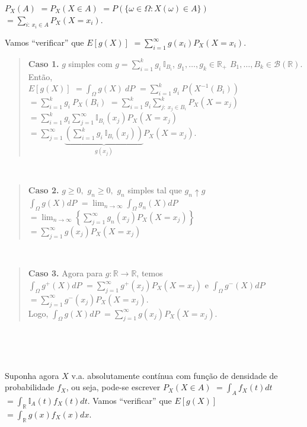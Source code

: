 \documentclass[
]{book}
\begin{document}
\(P_X(A)\) \(=P_X(X \in A)\) \(=P\left(\{\omega\in\Omega: X(\omega) \in A\}\right)\) \(=\displaystyle\sum_{i:~x_i\in A} P_X(X=x_i)\).

Vamos ``verificar'' que \(E\left[g(X)\right]\) \(=\displaystyle\sum_{i=1}^\infty g(x_i)P_X(X=x_i)\).

\begin{quote}
\textbf{Caso 1.} \(g\) simples com \(g = \displaystyle\sum_{i=1}^kg_i~\mathbb{I}_{B_i}\), \(g_1,\ldots,g_k \in \mathbb{R}_+\) \(B_1,\ldots,B_k \in \mathcal{B}(\mathbb{R})\). Então,\\
\(E\left[g(X)\right]\) \(=\displaystyle\int_\Omega g(X)~dP\)
\(=\displaystyle\sum_{i=1}^k g_i~P\left(X^{-1}(B_i)\right)\)
\(=\displaystyle\sum_{i=1}^k g_i~P_X(B_i)\)
\(=\displaystyle\sum_{i=1}^k g_i \sum_{j:~x_j \in B_i}^k P_X(X = x_j)\)
\(=\displaystyle\sum_{i=1}^k g_i \sum_{j=1}^\infty \mathbb{I}_{B_i}(x_j)P_X(X=x_j)\)
\(=\displaystyle\sum_{j=1}^\infty \underbrace{\left(\sum_{i=1}^k g_i ~\mathbb{I}_{B_i}(x_j)\right)}_{g(x_j)}P_X(X = x_j)\).
\end{quote}

\(~\)

\begin{quote}
\textbf{Caso 2.} \(g\geq 0,\) \(g_n\geq0,\) \(g_n\) simples tal que \(g_n \uparrow g\)\\
\(\displaystyle\int_\Omega g(X)dP\) \(=\displaystyle\lim_{n\rightarrow\infty}\int_\Omega g_n(X)dP\) \(=\displaystyle\lim_{n\rightarrow\infty}\left\{\sum_{j=1}^\infty g_n(x_j)P_X(X=x_j)\right\}\) \(=\displaystyle\sum_{j=1}^\infty g(x_j)P_X(X = x_j)\)
\end{quote}

\(~\)

\begin{quote}
\textbf{Caso 3.} Agora para \(g: \mathbb{R} \longrightarrow \mathbb{R}\), temos\\
\(\displaystyle\int_\Omega g^+(X)dP\)
\(=\displaystyle\sum_{j=1}^\infty g^+(x_j)P_X(X = x_j)\) e
\(\displaystyle\int_\Omega g^-(X)dP\)
\(=\displaystyle\sum_{j=1}^\infty g^-(x_j)P_X(X = x_j)\).\\
Logo, \(\displaystyle\int_\Omega g(X)dP\) \(=\displaystyle\sum_{j=1}^\infty g(x_j)P_X(X = x_j)\).
\end{quote}

\(~\)

\(~\)

Suponha agora \(X\) v.a. absolutamente contínua com função de densidade de probabilidade \(f_X\), ou seja, pode-se escrever \(P_X(X\in A)\) \(=\displaystyle\int_Af_X(t)dt\) \(=\displaystyle\int_{\mathbb{R}}\mathbb{I}_A(t)f_X(t)dt\). Vamos ``verificar'' que \(E\left[g(X)\right]\) \(=\displaystyle\int_{\mathbb{R}} g(x)f_X(x)dx\).
\end{document}
